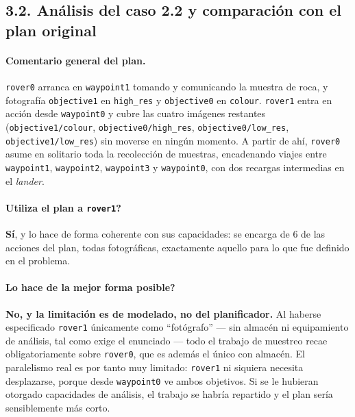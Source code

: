 \documentclass[12pt,a4paper]{article}
\begin{document}
\subsection{3.2. An\'alisis del caso 2.2 y comparaci\'on con el plan original}

\paragraph{Comentario general del plan.}
\texttt{rover0} arranca en \texttt{waypoint1} tomando y comunicando la muestra
de roca, y fotograf\'ia \texttt{objective1} en \texttt{high\_res} y
\texttt{objective0} en \texttt{colour}. \texttt{rover1} entra en acci\'on desde
\texttt{waypoint0} y cubre las cuatro im\'agenes restantes
(\texttt{objective1/colour}, \texttt{objective0/high\_res},
\texttt{objective0/low\_res}, \texttt{objective1/low\_res}) sin moverse en
ning\'un momento. A partir de ah\'i, \texttt{rover0} asume en solitario toda
la recolecci\'on de muestras, encadenando viajes entre \texttt{waypoint1},
\texttt{waypoint2}, \texttt{waypoint3} y \texttt{waypoint0}, con dos recargas
intermedias en el \emph{lander}.

\paragraph{\textquestiondown Utiliza el plan a \texttt{rover1}?}
\textbf{S\'i}, y lo hace de forma coherente con sus capacidades: se encarga de
6 de las acciones del plan, todas fotogr\'aficas, exactamente aquello para lo
que fue definido en el problema.

\paragraph{\textquestiondown Lo hace de la mejor forma posible?}
\textbf{No, y la limitaci\'on es de modelado, no del planificador.} Al haberse
especificado \texttt{rover1} \'unicamente como ``fot\'ografo'' --- sin
almac\'en ni equipamiento de an\'alisis, tal como exige el enunciado --- todo
el trabajo de muestreo recae obligatoriamente sobre \texttt{rover0}, que es
adem\'as el \'unico con almac\'en. El paralelismo real es por tanto muy
limitado: \texttt{rover1} ni siquiera necesita desplazarse, porque desde
\texttt{waypoint0} ve ambos objetivos. Si se le hubieran otorgado capacidades
de an\'alisis, el trabajo se habr\'ia repartido y el plan ser\'ia
sensiblemente m\'as corto.
\end{document}
